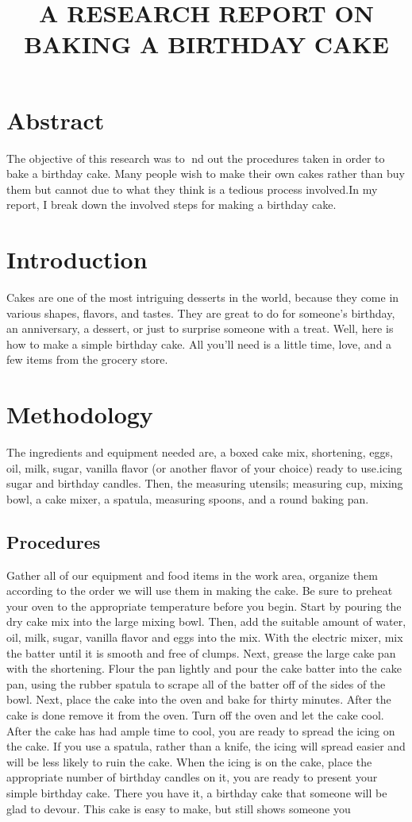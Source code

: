 \documentclass{article}
\begin{document}
\title{A RESEARCH REPORT ON BAKING A BIRTHDAY CAKE}
\maketitle


\section{ Abstract}

{The objective of this research was to nd out the procedures taken in order to bake a birthday cake. Many people wish to make their own cakes rather than buy them but cannot due to what they think is a tedious process involved.In my report, I break down the involved steps for making a birthday cake.}
\section{ Introduction}
{Cakes are one of the most intriguing desserts in the world, because they come in various shapes, flavors, and tastes. They are great to do for someone's birthday, an anniversary, a dessert, or just to surprise someone with a treat. Well, here is how to make a simple birthday cake. All you'll need is a little time, love, and a few items from the grocery store.}

\section{ Methodology}
{The ingredients and equipment needed are, a boxed cake mix, shortening, eggs,
oil, milk, sugar, vanilla  flavor (or another  flavor of your choice) ready to use.icing sugar and birthday candles. Then, the measuring utensils; measuring cup, mixing bowl, a cake mixer, a spatula, measuring spoons, and a round baking pan. }
\subsection{Procedures}
{Gather all of our equipment and food items in the work area, organize them according to the order we will use them in making the cake. Be sure to preheat your oven to the appropriate temperature before you begin. Start by pouring the dry cake mix into the large mixing bowl. Then, add the suitable amount of water, oil, milk, sugar, vanilla  flavor and eggs into the mix. With the electric mixer, mix the batter until it is smooth and free of clumps. Next, grease the large cake pan with the shortening. Flour the pan lightly and pour the cake batter into the cake pan, using the rubber spatula to scrape all of the batter off of the sides of the bowl. Next, place the cake into the oven and bake for thirty minutes. After the cake is done remove it from the oven. Turn off the oven and let the cake cool. After the cake has had ample time to cool, you are ready to spread the icing on the cake. If you use a spatula, rather than a knife, the icing will spread easier and will be less likely to ruin the cake. When the icing is on the cake, place the appropriate number of birthday candles on it, you are ready to present your simple birthday cake. There you have it, a birthday cake that someone will be glad to devour. This cake is easy to make, but still shows someone you}
\end{document}
